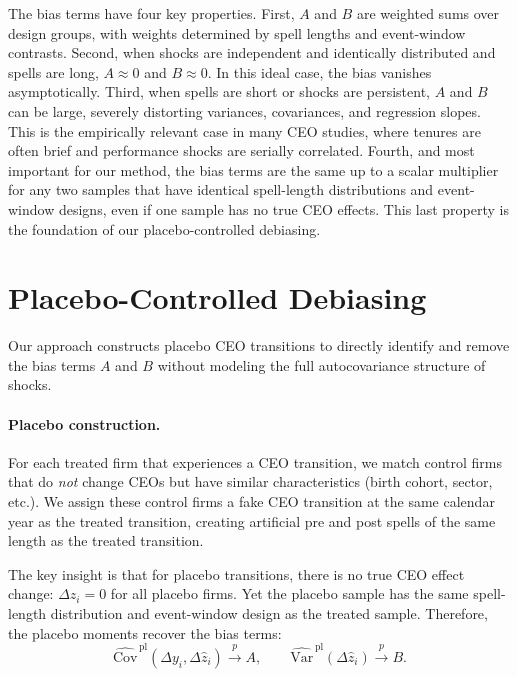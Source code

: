\documentclass[11pt,a4paper]{article}
\newcommand{\Var}{\text{Var}}
\newcommand{\Cov}{\text{Cov}}
\begin{document}
The bias terms have four key properties. First, $A$ and $B$ are weighted sums over design groups, with weights determined by spell lengths and event-window contrasts. Second, when shocks are independent and identically distributed and spells are long, $A\approx 0$ and $B\approx 0$. In this ideal case, the bias vanishes asymptotically. Third, when spells are short or shocks are persistent, $A$ and $B$ can be large, severely distorting variances, covariances, and regression slopes. This is the empirically relevant case in many CEO studies, where tenures are often brief and performance shocks are serially correlated. Fourth, and most important for our method, the bias terms are the same up to a scalar multiplier for any two samples that have identical spell-length distributions and event-window designs, even if one sample has no true CEO effects. This last property is the foundation of our placebo-controlled debiasing.

\section{Placebo-Controlled Debiasing} 

Our approach constructs placebo CEO transitions to directly identify and remove the bias terms $A$ and $B$ without modeling the full autocovariance structure of shocks.

\paragraph{Placebo construction.} For each treated firm that experiences a CEO transition, we match control firms that do \emph{not} change CEOs but have similar characteristics (birth cohort, sector, etc.). We assign these control firms a fake CEO transition at the same calendar year as the treated transition, creating artificial pre and post spells of the same length as the treated transition.

The key insight is that for placebo transitions, there is no true CEO effect change: $\Delta z_i = 0$ for all placebo firms. Yet the placebo sample has the same spell-length distribution and event-window design as the treated sample. Therefore, the placebo moments recover the bias terms:
\begin{equation}
\widehat{\Cov}^{\,\text{pl}}(\Delta y_i,\Delta \hat z_i) \xrightarrow{p} A,\qquad \widehat{\Var}^{\,\text{pl}}(\Delta \hat z_i) \xrightarrow{p} B.
\end{equation}
\end{document}
